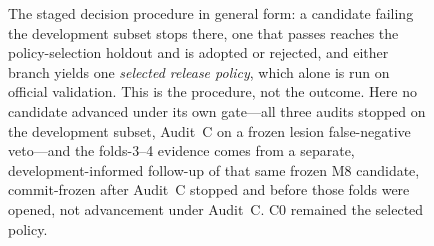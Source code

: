 \documentclass[runningheads]{llncs}
\begin{document}
\begin{figure}[tbp]
\centering
{}
\caption{The staged decision procedure in general form: a candidate failing the development subset
stops there, one that passes reaches the policy-selection holdout and is adopted or rejected, and
either branch yields one \emph{selected release policy}, which alone is run on official validation.
This is the procedure, not the outcome. Here no candidate advanced under its own gate---all three
audits stopped on the development subset, Audit~C on a frozen lesion false-negative veto---and the
folds-3--4 evidence comes from a separate, development-informed follow-up of that same frozen M8
candidate, commit-frozen after Audit~C stopped and before those folds were opened, not advancement
under Audit~C. C0 remained the selected policy.}
\label{fig:workflow}
\end{figure}
\end{document}

